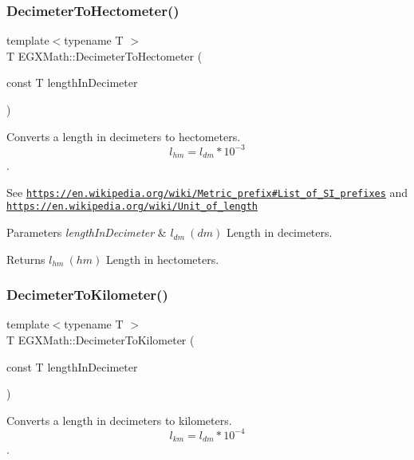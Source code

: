 \subsubsection{\texorpdfstring{Decimeter\+To\+Hectometer()}{DecimeterToHectometer()}}
{\footnotesize\ttfamily template$<$typename T $>$ \\
T E\+G\+X\+Math\+::\+Decimeter\+To\+Hectometer (\begin{DoxyParamCaption}\item[{const T}]{length\+In\+Decimeter }\end{DoxyParamCaption})}



Converts a length in decimeters to hectometers. \[ l_{hm}=l_{dm} * 10^{-3} \]. 

See \href{https://en.wikipedia.org/wiki/Metric_prefix#List_of_SI_prefixes}{\tt https\+://en.\+wikipedia.\+org/wiki/\+Metric\+\_\+prefix\#\+List\+\_\+of\+\_\+\+S\+I\+\_\+prefixes} and \href{https://en.wikipedia.org/wiki/Unit_of_length}{\tt https\+://en.\+wikipedia.\+org/wiki/\+Unit\+\_\+of\+\_\+length} 
\begin{DoxyParams}{Parameters}
{\em length\+In\+Decimeter} & $ l_{dm}\ (dm)$ Length in decimeters. \\
\hline
\end{DoxyParams}
\begin{DoxyReturn}{Returns}
$ l_{hm}\ (hm)$ Length in hectometers. 
\end{DoxyReturn}
\mbox{\label{group___e_g_x_math-_conversions-_length_conversions-_decimeter-_s_i_gaad90a14189b6602a87b449adb1cd5e82}} 
\subsubsection{\texorpdfstring{Decimeter\+To\+Kilometer()}{DecimeterToKilometer()}}
{\footnotesize\ttfamily template$<$typename T $>$ \\
T E\+G\+X\+Math\+::\+Decimeter\+To\+Kilometer (\begin{DoxyParamCaption}\item[{const T}]{length\+In\+Decimeter }\end{DoxyParamCaption})}



Converts a length in decimeters to kilometers. \[ l_{km}=l_{dm} * 10^{-4} \]. 

